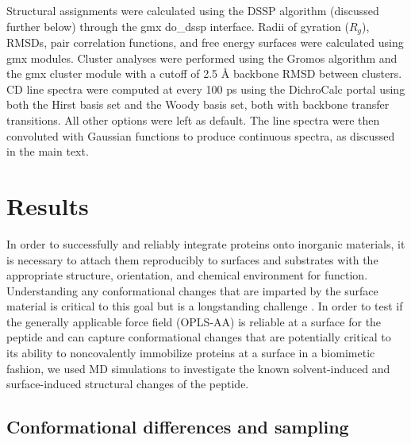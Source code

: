 Structural assignments were calculated using the DSSP algorithm (discussed further below)\cite{Kabsch1983, Joosten2011} through the gmx do\_dssp interface. 
Radii of gyration ($R_g$), RMSDs, pair correlation functions, and free energy surfaces were calculated using gmx modules. 
Cluster analyses were performed using the Gromos algorithm\cite{Daura1999} and the gmx cluster module with a cutoff of 2.5 \si{\angstrom} backbone RMSD between clusters. 
CD line spectra were computed at every 100 ps using the DichroCalc portal\cite{Bulheller2009, Jasim2018} using both the Hirst basis set\cite{Hirst1998, Besley1999} and the Woody basis set\cite{Woody1999}, both with backbone transfer transitions. 
All other options were left as default. 
The line spectra were then convoluted with Gaussian functions to produce continuous spectra, as discussed in the main text.

\section{Results}

In order to successfully and reliably integrate proteins onto inorganic materials, it is necessary to attach them reproducibly to surfaces and substrates with the appropriate structure, orientation, and chemical environment for function. 
Understanding any conformational changes that are imparted by the surface material is critical to this goal but is a longstanding challenge \cite{Hlady1996, Castner2002, Latour2005biomaterials}.
In order to test if the generally applicable force field (OPLS-AA) is reliable at a surface for the \pep{} peptide and can capture conformational changes that are potentially critical to its ability to noncovalently immobilize proteins at a surface in a biomimetic fashion, we used MD simulations to investigate the known solvent-induced and surface-induced structural changes of the peptide.

\subsection{Conformational differences and sampling}

